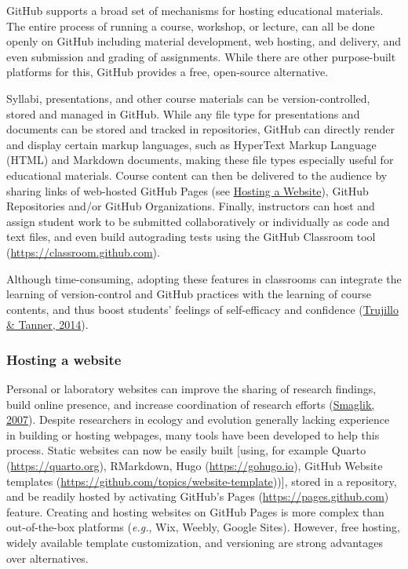 GitHub supports a broad set of mechanisms for hosting educational materials.
The entire process of running a course, workshop, or lecture, can all be done openly on GitHub including material development, web hosting, and delivery, and even submission and grading of assignments.
While there are other purpose-built platforms for this, GitHub provides a free, open-source alternative.

Syllabi, presentations, and other course materials can be version-controlled, stored and managed in GitHub.
While any file type for presentations and documents can be stored and tracked in repositories, GitHub can directly render and display certain markup languages, such as HyperText Markup Language (HTML) and Markdown documents, making these file types especially useful for educational materials.
Course content can then be delivered to the audience by sharing links of web-hosted GitHub Pages (see \protect\hyperlink{hosting-a-website}{Hosting a Website}), GitHub Repositories and/or GitHub Organizations.
Finally, instructors can host and assign student work to be submitted collaboratively or individually as code and text files, and even build autograding tests using the GitHub Classroom tool (\url{https://classroom.github.com}).

Although time-consuming, adopting these features in classrooms can integrate the learning of version-control and GitHub practices with the learning of course contents, and thus boost students' feelings of self-efficacy and confidence (\protect\hyperlink{ref-dqrFjoSb}{Trujillo \& Tanner, 2014}).

\hypertarget{hosting-a-website}{%
\subsubsection{Hosting a website}\label{hosting-a-website}}

Personal or laboratory websites can improve the sharing of research findings, build online presence, and increase coordination of research efforts (\protect\hyperlink{ref-HiIPSSHV}{Smaglik, 2007}).
Despite researchers in ecology and evolution generally lacking experience in building or hosting webpages, many tools have been developed to help this process.
Static websites can now be easily built {[}using, for example Quarto (\url{https://quarto.org}), RMarkdown, Hugo (\url{https://gohugo.io}), GitHub Website templates (\url{https://github.com/topics/website-template})){]}, stored in a repository, and be readily hosted by activating GitHub's Pages (\url{https://pages.github.com}) feature.
Creating and hosting websites on GitHub Pages is more complex than out-of-the-box platforms (\emph{e.g.}, Wix, Weebly, Google Sites).
However, free hosting, widely available template customization, and versioning are strong advantages over alternatives.

